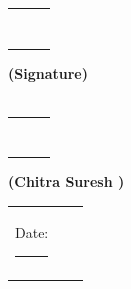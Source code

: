             \begin{tabular}{ccc}

                   \rule{10mm}{0pt}\hspace{1.7in} &\rule{10mm}{0pt} &  \hspace{04mm}  \rule{7cm}{1sp}
                  \\\vspace{0.0in}
                                   &&   \\

                \end{tabular}
                \vspace{0.1in}
                \vspace{0.0in} \hspace{04.4in} \textbf{(Signature)}\vspace{0.3in}\\
                \vspace{0.1in}\\

                 \begin{tabular}{ccc}

                                   \rule{10mm}{0pt}\hspace{1.7in} &\rule{10mm}{0pt} &  \hspace{04mm}  \rule{7cm}{1sp}
                                  \\\vspace{0.0in}
                                                   &&   \\

                                \end{tabular}
                                \vspace{0.0in}
                                 \hspace{03.9in} \textbf{(Chitra Suresh )}\vspace{0.3in}\\

\vspace{0.5in}


\begin{tabular}{ccc}

      Date: \rule{5cm}{1sp} &\rule{5mm}{0pt} & \rule{10mm}{0pt}
      \\\vspace{0.1in}
                       &&   \\

    \end{tabular}

